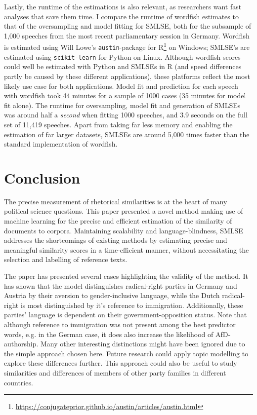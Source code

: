 \documentclass{article}
\begin{document}
Lastly, the runtime of the estimations is also relevant, as researchers want fast analyses that save them time. I compare the runtime of wordfish estimates to that of the oversampling and model fitting for SMLSE, both for the subsample of 1,000 speeches from the most recent parliamentary session in Germany. Wordfish is estimated using Will Lowe's \texttt{austin}-package for R\footnote{\url{https://conjugateprior.github.io/austin/articles/austin.html}} on Windows; SMLSE's are estimated using \texttt{scikit-learn} for Python on Linux. Although wordfish scores could well be estimated with Python and SMLSEs in R (and speed differences partly be caused by these different applications), these platforms reflect the most likely use case for both applications. Model fit and prediction for each speech with wordfish took 44 minutes for a sample of 1000 cases (35 minutes for model fit alone). The runtime for oversampling, model fit and generation of SMLSEs was around half a \textit{second} when fitting 1000 speeches, and 3.9 seconds on the full set of 11,419 speeches. Apart from taking far less memory and enabling the estimation of far larger datasets, SMLSEs are around  5,000 times faster than the standard implementation of wordfish.


\section{Conclusion}

The precise measurement of rhetorical similarities is at the heart of many political science questions. This paper presented a novel method making use of machine learning for the precise and efficient estimation of the similarity of documents to corpora. Maintaining scalability and language-blindness, SMLSE addresses the shortcomings of existing methods by estimating precise and meaningful similarity scores in a time-efficient manner, without necessitating the selection and labelling of reference texts. \par

The paper has presented several cases highlighting the validity of the method. It has shown that the model distinguishes radical-right parties in Germany and Austria by their aversion to gender-inclusive language, while the Dutch radical-right is most distinguished by it's reference to immigration. Additionally, these parties' language is dependent on their government-opposition status. Note that although reference to immigration was not present among the best predictor words, e.g. in the German case, it does also increase the likelihood of AfD-authorship. Many other interesting distinctions might have been ignored due to the simple approach chosen here. Future research could apply topic modelling to explore these differences further. This approach could also be useful to study similarities and differences of members of other party families in different countries.\par
\end{document}
